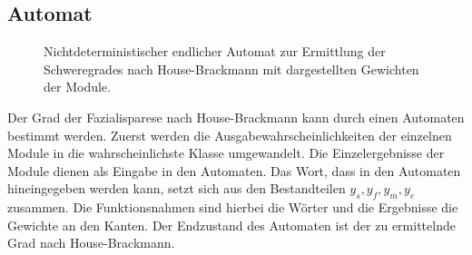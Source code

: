 \subsection{Automat}\label{automata}
\begin{figure}[b]
\begin{center}
\caption[Nichtdeterministischer endlicher Automat zur Ermittlung der Schweregrades nach House-Brackmann mit dargestellten Gewichten der Module]{Nichtdeterministischer endlicher Automat zur Ermittlung der Schweregrades nach House-Brackmann mit dargestellten Gewichten der Module.}\label{cap:automata}
\end{center}
\end{figure}\label{fig:automata}

Der Grad der Fazialisparese nach House-Brackmann kann durch einen Automaten bestimmt werden. Zuerst werden die Ausgabewahrscheinlichkeiten der einzelnen Module in die wahrscheinlichste Klasse umgewandelt. Die Einzelergebnisse der Module dienen als Eingabe in den Automaten. Das Wort, dass in den Automaten hineingegeben werden kann, setzt sich aus den Bestandteilen $y_s, y_f, y_m, y_e$ zusammen. Die Funktionsnahmen sind hierbei die Wörter und die Ergebnisse die Gewichte an den Kanten. Der Endzustand des Automaten ist der zu ermittelnde Grad nach House-Brackmann.

